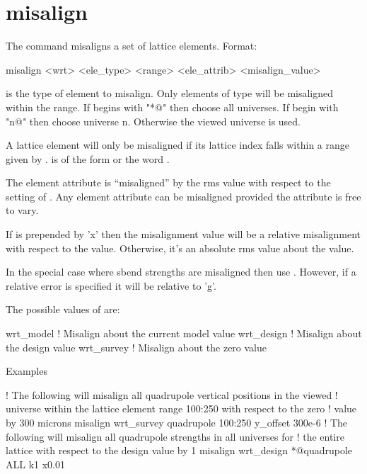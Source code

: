 \section{misalign}
\label{s:misalign}

The  command misaligns a set of lattice elements. Format:
\begin{example}
   misalign <wrt> <ele_type> <range> <ele_attrib> <misalign_value>
\end{example}

\vskip 0.2in 

 is the type of element to misalign.  Only
elements of type  will be misaligned within the range.
If  begins with "*@" then choose all universes. If
 begin with "n@" then choose universe n. Otherwise the
viewed universe is used.

A lattice element will only be misaligned if its lattice index falls within
a range given by .  is of the form
 or the word . 

The element attribute  is ``misaligned'' by the rms
value  with respect to the setting of
. Any element attribute can be misaligned provided the
attribute is free to vary.

If  is prepended by 'x' then the misalignment value will be
a relative misalignment with respect to the  value. Otherwise, it's an 
absolute rms value about the  value.

In the special case where sbend strengths are misaligned then use
. However, if a relative error is specified it will be 
relative to 'g'.

The possible values of  are:
\begin{example}
  wrt_model          ! Misalign about the current model value
  wrt_design         ! Misalign about the design value
  wrt_survey         ! Misalign about the zero value
\end{example}

Examples
\begin{example}
   ! The following will misalign all quadrupole vertical positions in the viewed
   ! universe within the lattice element range 100:250 with respect to the zero 
   ! value by 300 microns
  misalign wrt_survey quadrupole 100:250 y_offset 300e-6
   ! The following will misalign all quadrupole strengths in all universes for
   ! the entire lattice with respect to the design value by 1%
  misalign wrt_design *@quadrupole ALL k1 x0.01
\end{example}

